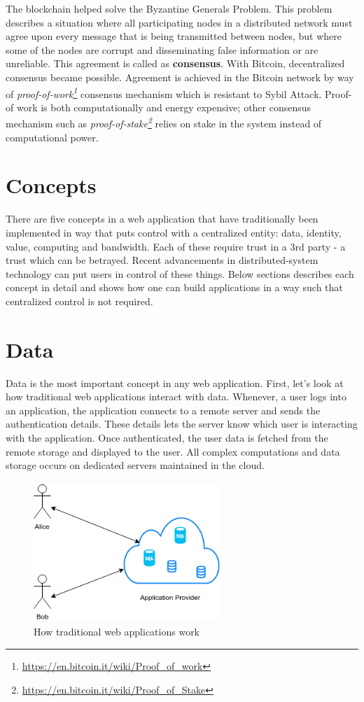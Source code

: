 	The blockchain helped solve the Byzantine Generals Problem\cite{lamport1982byzantine}. This problem describes a situation where all participating nodes in a distributed network must agree upon every message that is being transmitted between nodes, but where some of the nodes are corrupt and disseminating false information or are unreliable. This agreement is called as \textbf{consensus}. With Bitcoin\cite{nakamoto2008bitcoin}, decentralized consensus became possible. Agreement is achieved in the Bitcoin network by way of \textit{proof-of-work\footnote{\url{https://en.bitcoin.it/wiki/Proof_of_work}}} consensus mechanism which is resistant to Sybil Attack\cite{douceur2002sybil}. Proof-of work is both computationally and energy expensive; other consensus mechanism such as \textit{proof-of-stake\footnote{\url{https://en.bitcoin.it/wiki/Proof_of_Stake}}} relies on stake in the system instead of computational power.
	
\section{Concepts}
	There are five concepts in a web application that have traditionally been implemented in way that puts control with a centralized entity: data, identity, value, computing and bandwidth\cite{raval2016decentralized}. Each of these require trust in a 3rd party - a trust which can be betrayed. Recent advancements in distributed-system technology can put users in control of these things. Below sections describes each concept in detail and shows how one can build applications in a way such that centralized control is not required.

\section{Data}
	Data is the most important concept in any web application. First, let's look at how traditional web applications interact with data. Whenever, a user logs into an application, the application connects to a remote server and sends the authentication details. These details lets the server know which user is interacting with the application. Once authenticated, the user data is fetched from the remote storage and displayed to the user. All complex computations and data storage occurs on dedicated servers maintained in the cloud.
		
	\begin{figure}[h]
		\centering
		\includegraphics[width=200pt, height=150pt]{figures/traditional-app}
		\caption{\label{fig:traditional-app} How traditional web applications work}
	\end{figure}
		
